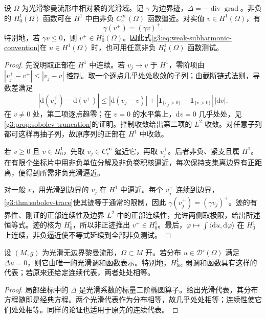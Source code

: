\begin{lemma}\label{g3:lem:positive-tests-and-traces}
	设 \(\Omega\) 为光滑黎曼流形中相对紧的光滑域。记 \(\gamma\) 为边界迹，\(\Delta=-\operatorname{div}\operatorname{grad}\)。非负的 \(H^1_0(\Omega)\) 函数可在 \(H^1\) 中由非负 \(C_c^\infty(\Omega)\) 函数逼近。对实值 \(v\in H^1(\Omega)\)，有
	\[
		\gamma(v^+)=(\gamma v)^+.
	\]
	特别地，若 \(\gamma v\le0\)，则 \(v^+\in H^1_0(\Omega)\)。因此式\eqref{g3:eq:weak-subharmonic-convention}在 \(u\in H^1(\Omega)\) 时，也可用任意非负 \(H^1_0(\Omega)\) 函数测试。
\end{lemma}
\begin{proof}
	先说明取正部在 \(H^1\) 中连续。若 \(v_j\to v\) 于 \(H^1\)，零阶项由 \(|v_j^+-v^+|\le|v_j-v|\) 控制。取一个逐点几乎处处收敛的子列；由截断链式法则，导数差满足
	\[
		|\mathrm d(v_j^+)-\mathrm d(v^+)|
		\le|\mathrm d(v_j-v)|
		+|\mathbf1_{\{v_j>0\}}-\mathbf1_{\{v>0\}}|\,|\mathrm dv|.
	\]
	在 \(v\ne0\) 处，第二项逐点趋零；在 \(v=0\) 的水平集上，\(\mathrm dv=0\) 几乎处处，见\cref{g3:prop:sobolev-truncation}的证明。控制收敛给出第二项的 \(L^2\) 收敛。对任意子列都可这样再抽子列，故原序列的正部在 \(H^1\) 中收敛。

	若 \(v\ge0\) 且 \(v\in H^1_0\)，先取 \(v_j\in C_c^\infty\) 逼近它，再取 \(v_j^+\)。后者非负、紧支且属 \(H^1\)。在有限个坐标片中用非负单位分解及非负卷积核逼近，每次保持支集离边界有正距离，便得到所需非负光滑逼近。

	对一般 \(v\)，用光滑到边界的 \(v_j\) 在 \(H^1\) 中逼近。每个 \(v_j^+\) 连续到边界，\cref{g3:thm:sobolev-trace}使其迹等于通常的限制，因此 \(\gamma(v_j^+)=(\gamma v_j)^+\)。迹的有界性、刚证的正部连续性及边界 \(L^2\) 中的正部连续性，允许两侧取极限，给出所述恒等式。迹的核为 \(H^1_0\)，所以非正迹推出 \(v^+\in H^1_0\)。最后，\(\varphi\mapsto\int\langle\mathrm du,\mathrm d\varphi\rangle\) 在 \(H^1_0\) 上连续，非负逼近使不等式延续到全部非负测试。
\end{proof}

\begin{proposition}\label{g3:prop:weak-harmonic-smoothing}
	设 \((M,g)\) 为光滑无边界黎曼流形，\(\Omega\subset M\) 开。若分布 \(u\in\mathcal D'(\Omega)\) 满足 \(\Delta u=0\)，则它由唯一的光滑调和函数表示。特别地，\(H^1_{\mathrm{loc}}\) 弱调和函数具有这样的代表；若原来还给定连续代表，两者处处相等。
\end{proposition}
\begin{proof}
	局部坐标中的 \(\Delta\) 是光滑系数的标量二阶椭圆算子。给出光滑代表，其分布方程随即是经典方程。两个光滑代表作为分布相等，故几乎处处相等；连续性使它们处处相等。同样的论证也适用于原先的连续代表。
\end{proof}

